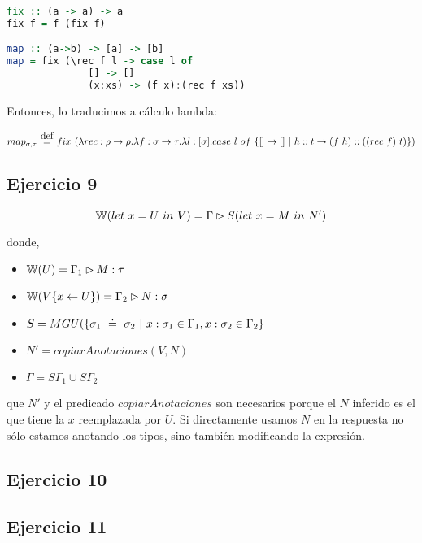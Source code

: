 \begin{lstlisting}[language=Haskell]
fix :: (a -> a) -> a
fix f = f (fix f)

map :: (a->b) -> [a] -> [b]
map = fix (\rec f l -> case l of
              [] -> []
              (x:xs) -> (f x):(rec f xs))
\end{lstlisting}

Entonces, lo traducimos a cálculo lambda:

\[map_{\sigma,\tau} \eqdef fix\ (\abs{rec}{\rho\to\rho}{\abs{f}{\sigma\to\tau}{\abs{l}{[\sigma]}{case\ l\ of\ \{[] \to [] \vert h::t \to (f\ h)::((rec\ f)\ t)\}}}}) \]


\subsection*{Ejercicio 9}

\[\mathbb{W}(let\ x = U\ in\ V) = \Gamma \rhd S(let\ x = M\ in\ N')\]

donde,

\begin{itemize}
  \item $\mathbb{W}(U) = \Gamma_1 \rhd M : \tau$
  \item $\mathbb{W}(V\{x\leftarrow U\}) = \Gamma_2 \rhd N: \sigma$
  \item $S = MGU(\{\sigma_1 \uni \sigma_2 \vert x:\sigma_1 \in \Gamma_1, x:\sigma_2 \in \Gamma_2\}$
  \item $N' = copiarAnotaciones(V,N)$
  \item $\Gamma = S\Gamma_1 \cup S\Gamma_2$
\end{itemize}

 que $N'$ y el predicado $copiarAnotaciones$ son necesarios porque el $N$ inferido es el que tiene la $x$ reemplazada por $U$. Si directamente usamos $N$ en la respuesta no sólo estamos anotando los tipos, sino también modificando la expresión.


\subsection*{Ejercicio 10}


\subsection*{Ejercicio 11}

